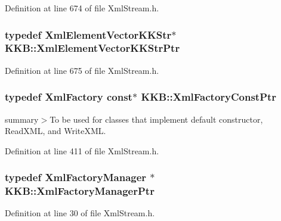 Definition at line 674 of file Xml\+Stream.\+h.

\subsubsection[{\texorpdfstring{Xml\+Element\+Vector\+K\+K\+Str\+Ptr}{XmlElementVectorKKStrPtr}}]{\setlength{\rightskip}{0pt plus 5cm}typedef {\bf Xml\+Element\+Vector\+K\+K\+Str}$\ast$ {\bf K\+K\+B\+::\+Xml\+Element\+Vector\+K\+K\+Str\+Ptr}}\hypertarget{namespace_k_k_b_a9681193b83eaa224848a738e348062c9}{}\label{namespace_k_k_b_a9681193b83eaa224848a738e348062c9}


Definition at line 675 of file Xml\+Stream.\+h.

\subsubsection[{\texorpdfstring{Xml\+Factory\+Const\+Ptr}{XmlFactoryConstPtr}}]{\setlength{\rightskip}{0pt plus 5cm}typedef {\bf Xml\+Factory} const$\ast$ {\bf K\+K\+B\+::\+Xml\+Factory\+Const\+Ptr}}\hypertarget{namespace_k_k_b_a041a4e8001c7f3e92bb2b8d417b47715}{}\label{namespace_k_k_b_a041a4e8001c7f3e92bb2b8d417b47715}


summary$>$To be used for classes that implement default constructor, Read\+X\+ML, and Write\+X\+ML.



Definition at line 411 of file Xml\+Stream.\+h.

\subsubsection[{\texorpdfstring{Xml\+Factory\+Manager\+Ptr}{XmlFactoryManagerPtr}}]{\setlength{\rightskip}{0pt plus 5cm}typedef {\bf Xml\+Factory\+Manager} $\ast$ {\bf K\+K\+B\+::\+Xml\+Factory\+Manager\+Ptr}}\hypertarget{namespace_k_k_b_aafda05381a8f75c01dcc4c7bca1fac5f}{}\label{namespace_k_k_b_aafda05381a8f75c01dcc4c7bca1fac5f}


Definition at line 30 of file Xml\+Stream.\+h.

